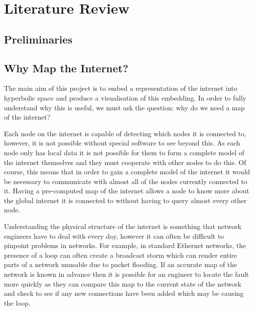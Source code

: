 \chapter{Literature Review}
\label{cha:LitReview}

\section{Preliminaries}
\label{sec:LitReviewPrelim}

\section{Why Map the Internet?}
\label{sec:LitReviewWhyMap}

The main aim of this project is to embed a representation of the internet into hyperbolic space and produce a visualisation of this embedding. In order to fully understand why this is useful, we must ask the question: why do we need a map of the internet? 

Each node on the internet is capable of detecting which nodes it is connected to, however, it is not possible without special software to see beyond this. As each node only has local data it is not possible for them to form a complete model of the internet themselves and they must cooperate with other nodes to do this. Of course, this means that in order to gain a complete model of the internet it would be necessary to communicate with almost all of the nodes currently connected to it. Having a pre-computed map of the internet allows a node to know more about the global internet it is connected to without having to query almost every other node. 

Understanding the physical structure of the internet is something that network engineers have to deal with every day, however it can often be difficult to pinpoint problems in networks. For example, in standard Ethernet networks, the presence of a loop can often create a broadcast storm which can render entire parts of a network unusable due to packet flooding. If an accurate map of the network is known in advance then it is possible for an engineer to locate the fault more quickly as they can compare this map to the current state of the network and check to see if any new connections have been added which may be causing the loop. 

